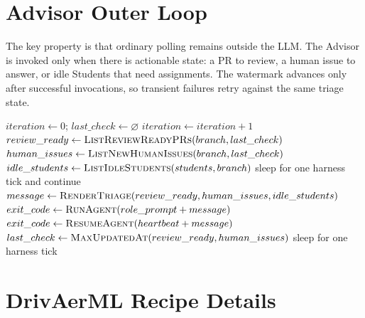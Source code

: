 \documentclass{article}
\begin{document}
\FloatBarrier

\clearpage
\section{Advisor Outer Loop}
\label{app:outer-loop}

The key property is that ordinary polling remains outside the LLM. The Advisor is invoked only when there is actionable state: a PR to review, a human issue to answer, or idle Students that need assignments. The watermark advances only after successful invocations, so transient failures retry against the same triage state.

\begin{algorithm}[h]
  \caption{Advisor triage loop outside the LLM context}
  \label{alg:advisor-outer-loop}
  \begin{algorithmic}[1]
    \STATE $iteration \leftarrow 0$; $last\_check \leftarrow \varnothing$
      \STATE $iteration \leftarrow iteration + 1$
      \STATE $review\_ready \leftarrow \textsc{ListReviewReadyPRs}(branch, last\_check)$
      \STATE $human\_issues \leftarrow \textsc{ListNewHumanIssues}(branch, last\_check)$
      \STATE $idle\_students \leftarrow \textsc{ListIdleStudents}(students, branch)$
        \STATE sleep for one harness tick and continue
      \ENDIF
      \STATE $message \leftarrow \textsc{RenderTriage}(review\_ready, human\_issues, idle\_students)$
        \STATE $exit\_code \leftarrow \textsc{RunAgent}(role\_prompt + message)$
      \ELSE
        \STATE $exit\_code \leftarrow \textsc{ResumeAgent}(heartbeat + message)$
      \ENDIF
        \STATE $last\_check \leftarrow \textsc{MaxUpdatedAt}(review\_ready, human\_issues)$
      \ENDIF
      \STATE sleep for one harness tick
    \ENDWHILE
  \end{algorithmic}
\end{algorithm}

\clearpage
\section{DrivAerML Recipe Details}
\label{app:drivaerml-recipe}
\end{document}
